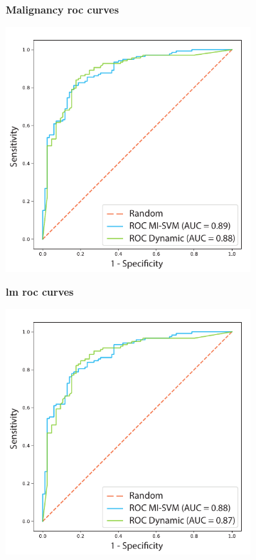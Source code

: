 \documentclass[journal,article,submit,moreauthors,pdftex, applsci]{Definitions/mdpi}
\begin{document}
\begin{figure}[H]
    \centering
    \begin{subfigure}{.45\linewidth}
        \centering
        \textbf{Malignancy \ac{roc} curves}\par
        \includegraphics[width=\linewidth]{Figures/Result_Malignancy.pdf}
    \end{subfigure} 
    \begin{subfigure}{.45\linewidth}
        \centering
        \textbf{\ac{lm} \ac{roc} curves}\par
        \includegraphics[width=\linewidth]{Figures/Result_LMM.pdf}
    \end{subfigure} 
    

\end{figure}
\end{document}

